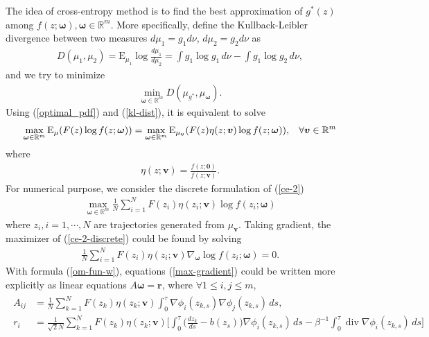 \documentclass[final]{siamltex}
\begin{document}
The idea of cross-entropy method is to find the best approximation of $g^*(z)$ among
$f(z;\bm{\omega}), \bm{\omega} \in \mathbb{R}^m$. More specifically, define the
Kullback-Leibler divergence between
two measures $d\mu_1 = g_1d\nu$, $d\mu_2 = g_2d\nu$ as
\begin{align}
  D(\mu_1, \mu_2) = \mathrm{E}_{\mu_1} \log \frac{d\mu_1}{d\mu_2} = \int
  g_1\log g_1\, d\nu - \int g_1\log g_2\,d\nu,
  \label{kl-dist}
\end{align}
and we try to minimize
\begin{align}
  \min_{\bm{\omega} \in \mathbb{R}^m} D(\mu_{g^*}, \mu_{\bm{\omega}}).
  \label{kl-dist-d}
\end{align}
Using (\ref{optimal_pdf}) and (\ref{kl-dist}), it is equivalent to solve
\begin{align}
  \max_{\bm{\omega} \in \mathbb{R}^m} \mathrm{E}_{\mu} ( F(z) \log
  f(z;\bm{\omega}))
  = \max_{\bm{\omega} \in \mathbb{R}^m} \mathrm{E}_{\mu_{\bm{v}}} ( F(z)
  \eta(z;\bm{v}) \log f(z;\bm{\omega})), \hspace{3mm} \forall \bm{v} \in
  \mathbb{R}^m
  \label{ce-2}
\end{align}
where
\begin{align}
  \eta(z;\bm{v}) = \frac{f(z;\bm{0})}{f(z;\bm{v})}.
\end{align}
For numerical purpose, we consider the discrete formulation of (\ref{ce-2})
\begin{align}
\max_{\bm{\omega} \in \mathbb{R}^m} \frac{1}{N} \sum_{i=1}^{N} F(z_i)
\eta(z_i; \bm{v}) \log f(z_i;\bm{\omega}) 
\label{ce-2-discrete}
\end{align}
where $z_i, i = 1, \cdots, N$ are trajectories generated from $\mu_{\bm{v}}$. 
Taking gradient, the maximizer of (\ref{ce-2-discrete}) could be found by solving
\begin{align}
  \frac{1}{N} \sum_{i=1}^{N} F(z_i) \eta(z_i; \bm{v}) \nabla_{\bm{\omega}} \log
  f(z_i;\bm{\omega}) = 0.
  \label{max-gradient}
\end{align}
With formula (\ref{om-fun-w}), equations (\ref{max-gradient}) could be written more explicitly
as linear equations $A\bm{\omega} = \bm{r}$, where $\forall 1\le i,j\le m$, 
\begin{align}
  \begin{split}
  A_{ij} &= \frac{1}{N}\sum_{k = 1}^{N} F(z_k)\eta(z_k; \bm{v}) \int_0^\tau
  \nabla\phi_i(z_{k,s})\nabla\phi_j(z_{k,s})\,ds, \\
     r_i &= \frac{1}{\sqrt{2}N}\sum_{k = 1}^{N} F(z_k)\eta(z_k; \bm{v})
  \Big[\int_0^\tau \Big(\frac{dz_k}{ds} - b(z_s)\Big)\nabla\phi_i(z_{k,s})\,ds
  - \beta^{-1} \int_0^\tau \operatorname{div} \nabla \phi_i(z_{k,s})\,ds\Big]
  \end{split}
  \label{linear-eqn}
\end{align}
\end{document}
